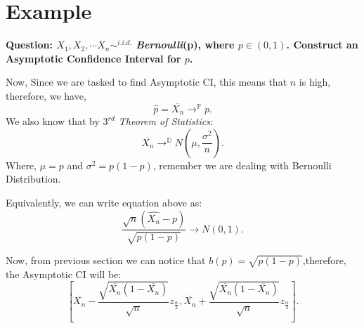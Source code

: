 \documentclass[a4paper]{article}
\begin{document}
\section{Example}	
\textbf{Question: $X_1, X_2,\cdots X_n \sim^{i.i.d.}$ \textit{Bernoulli}(p), where $p \in (0,1)$. Construct an Asymptotic Confidence Interval for  $p$.	}

Now, Since we are tasked to find Asymptotic CI, this means that $n$ is high, therefore, we have,
\[
	\hat{p} = \overline{X_n} \to^{\mathbb{P}}  p
.\] 
We also know that by \textit{$3^{rd}$ Theorem of Statistics}:
\[
	\overline{X_n}\to^{\mathbb{D}} N(\mu, \frac{\sigma^2}{n}) 
.\] 	
Where, $\mu = p$ and  $\sigma^2 = p\left( 1-p \right) $, remember we are dealing with Bernoulli Distribution.

Equivalently, we can write equation above as:
\[
	\frac{\sqrt{n} \left( \hat{X_n} - p  \right) }{\sqrt{p\left( 1-p \right) } } \to N(0,1)
.\] 	

Now, from previous section we can notice that $b(p) = \sqrt{p\left( 1-p \right) } $,therefore, the Asymptotic CI will be:
\[
	\left[ \overline{X_n} - \frac{\sqrt{\overline{X_n}\left( 1-\overline{X_n} \right) } }{\sqrt{n} }z_\frac{\alpha}{2}, \overline{X_n} + \frac{\sqrt{\overline{X_n}\left( 1 - \overline{X_n} \right) } }{\sqrt{n} }z_\frac{\alpha}{2} \right] 
.\] 
\end{document}
